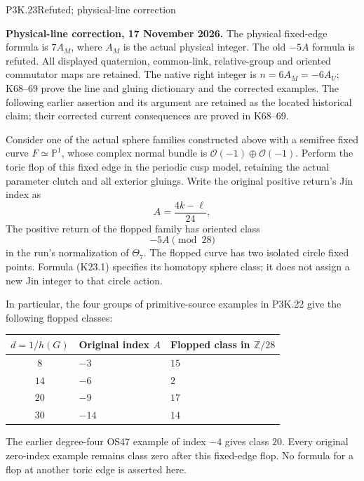\begin{statement}{P3K.23}{Refuted; physical-line correction}\par\noindent\textbf{Physical-line correction, 17 November 2026.} The physical fixed-edge formula is \(7A_M\), where \(A_M\) is the actual physical integer. The old \(-5A\) formula is refuted. All displayed quaternion, common-link, relative-group and oriented commutator maps are retained. The native right integer is \(n=6A_M=-6A_U\); K68--69 prove the line and gluing dictionary and the corrected examples. The following earlier assertion and its argument are retained as the located historical claim; their corrected current consequences are proved in K68--69.\medskip\par 
Consider one of the actual sphere families constructed above with a
semifree fixed curve \(F\simeq\mathbb P^1\), whose complex normal bundle
is \(\mathcal O(-1)\oplus\mathcal O(-1)\). Perform the toric flop of
this fixed edge in the periodic cusp model, retaining the actual
parameter clutch and all exterior gluings. Write the original positive
return's Jin index as
\[
             A=\frac{4k-\ell}{24},
\]
The positive return of the flopped family has oriented class
\[
                         -5A\pmod {28}                 \tag{K23.1}
\]
in the run's normalization of \(\Theta _7\). The flopped curve has two
isolated circle fixed points. Formula (K23.1) specifies its homotopy
sphere class; it does not assign a new Jin integer to that circle
action.

In particular, the four groups of primitive-source examples in
P3K.22 give the following flopped classes:


\begin{center}\small\begin{tabular}{c l l}\hline
\(d=1/h(G)\) & Original index \(A\) & Flopped class in \(\mathbb Z/28\) \\
\hline
\(8\) & \(-3\) & \(15\) \\
\(14\) & \(-6\) & \(2\) \\
\(20\) & \(-9\) & \(17\) \\
\(30\) & \(-14\) & \(14\) \\
\hline\end{tabular}\end{center}

The earlier degree-four OS47 example of index \(-4\) gives class
\(20\). Every original zero-index example remains class zero after
this fixed-edge flop. No formula for a flop at another toric edge is
asserted here.
\end{statement}

